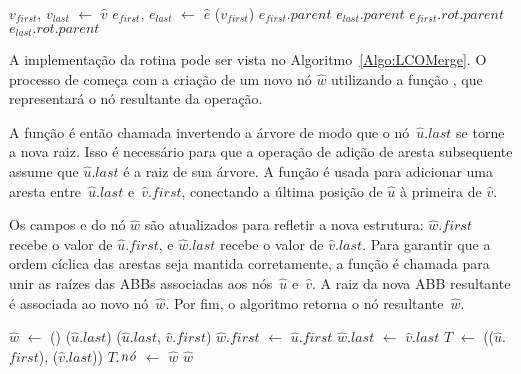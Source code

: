 \begin{algorithm}[htb]
\caption{\LCOFindSubNode($\hat v$, $\hat e$)}
\label{Algo:LCOFindSubNode}
\begin{algorithmic}[1]
\State $v_{first}$, $v_{last}$ $\gets$ $\hat v$
\State $e_{first}$, $e_{last}$ $\gets$ $\hat e$
\State \linkcutEvert($v_{first}$)
\State \Return $e_{first}$.$parent$
\EndIf
\State \Return $e_{last}$.$parent$
\Else
{}
\State \Return $e_{first}.rot.parent$
\Else
\State \Return $e_{last}.rot.parent$
\EndIf
\EndIf
\end{algorithmic}
\end{algorithm}


A implementação da rotina \LCOMerge pode ser vista no Algoritmo~\ref{Algo:LCOMerge}.
O processo de \LCOMerge{} começa com a criação de um novo nó $\hat w$ utilizando a função \LCOMakeNode, que representará o nó resultante da operação.

A função \linkcutEvert{} é então chamada invertendo a árvore de modo que o nó~$\hat u$.$last$ se torne a nova raiz.
Isso é necessário para que a operação \linkcutAddEdge de adição de aresta subsequente assume que $\hat u$.$last$ é a raiz de sua árvore.
A função \linkcutAddEdge é usada para adicionar uma aresta entre~$\hat u$.$last$ e~$\hat v$.$first$, conectando a última posição de $\hat u$ à primeira de $\hat v$.

Os campos  e  do nó $\hat w$ são atualizados para refletir a nova estrutura: $\hat w$.$first$ recebe o valor de $\hat u$.$first$, e $\hat w$.$last$ recebe o valor de $\hat v$.$last$. Para garantir que a ordem cíclica das arestas seja mantida corretamente, a função \treapJoin{} é chamada para unir as raízes das ABBs associadas aos nós~$\hat u$ e~$\hat v$. A raiz da nova ABB resultante é associada ao novo nó~$\hat w$.
Por fim, o algoritmo retorna o nó resultante~$\hat w$.

\begin{algorithm}[htb]
\caption{\LCOMerge($\hat u$, $\hat v$)}
\label{Algo:LCOMerge}
\begin{algorithmic}[1]
\State $\hat w$ $\gets$ \LCOMakeNode()
\State \linkcutEvert($\hat u$.$last$)
\State \linkcutAddEdge($\hat u$.$last$, $\hat v$.$first$)
\State $\hat w$.$first$  $\gets$ $\hat u$.$first$
\State $\hat w$.$last$  $\gets$ $\hat v$.$last$
\State $T$ $\gets$ \treapJoin(\treapGetRoot($\hat u$.$first$), \treapGetRoot($\hat v$.$last$))
\State $T$.$\mathit{n\acute{o}}$ $\gets$ $\hat w$
\State \Return $\hat w$
\end{algorithmic}
\end{algorithm}

